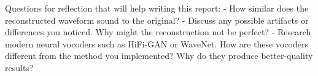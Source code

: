 \documentclass[12pt]{article}
\begin{document}
Questions for reflection that will help writing this report:
- How similar does the reconstructed waveform sound to the original?
- Discuss any possible artifacts or differences you noticed. Why might the reconstruction not be perfect?
- Research modern neural vocoders such as HiFi-GAN or WaveNet. How are these vocoders different from the method you implemented? Why do they produce better-quality results?


\newpage


\end{document}
